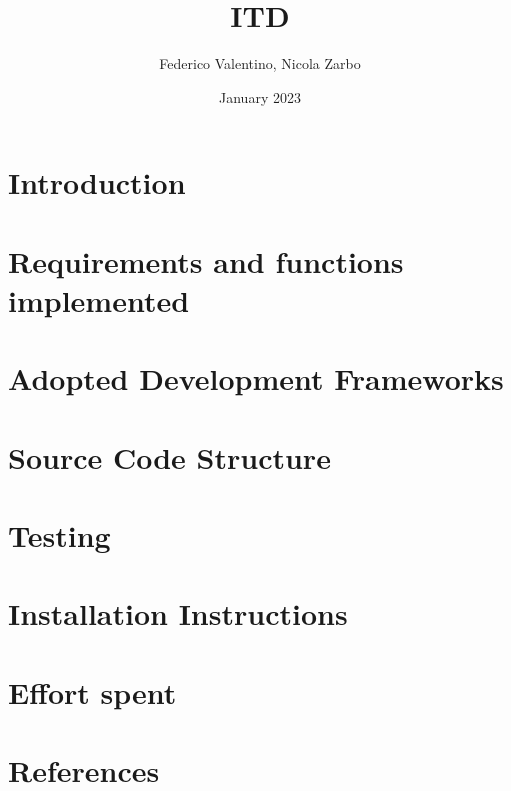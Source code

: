 \documentclass[oneside]{book}
\begin{document}
\title{ITD}
\author{Federico Valentino, Nicola Zarbo }
\date{January 2023}


\maketitle
\newpage
\setcounter{page}{1}

\tableofcontents %
\cleardoublepage

\chapter{Introduction}

\newpage

\chapter{Requirements and functions implemented}

\newpage

\chapter{Adopted Development Frameworks}

\newpage

\chapter{Source Code Structure}

\newpage

\chapter{Testing}

\newpage

\chapter{Installation Instructions}

\newpage

\chapter{Effort spent}

\newpage

\chapter{References}

\newpage
\end{document}
